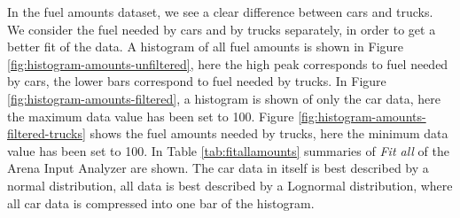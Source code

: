 In the fuel amounts dataset, we see a clear difference between cars and trucks.
We consider the fuel needed by cars and by trucks separately, in order to get a better fit of the data.
A histogram of all fuel amounts is shown in Figure \ref{fig:histogram-amounts-unfiltered}, here the high peak corresponds to fuel needed by cars, the lower bars correspond to fuel needed by trucks.
In Figure \ref{fig:histogram-amounts-filtered}, a histogram is shown of only the car data, here the maximum data value has been set to 100.
Figure \ref{fig:histogram-amounts-filtered-trucks} shows the fuel amounts needed by trucks, here the minimum data value has been set to 100.
In Table \ref{tab:fitallamounts} summaries of \textit{Fit all} of the Arena Input Analyzer are shown.
The car data in itself is best described by a normal distribution, all data is best described by a Lognormal distribution, where all car data is compressed into one bar of the histogram.





